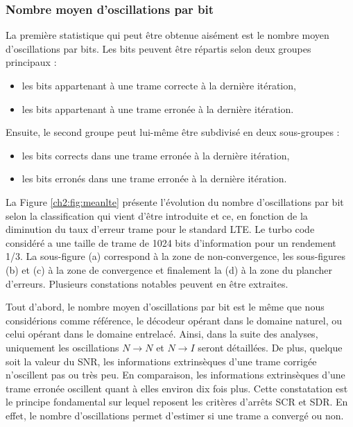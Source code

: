 \subsubsection{Nombre moyen d'oscillations par bit}
La première statistique qui peut être obtenue aisément est le nombre moyen d'oscillations par bits. Les bits peuvent être 
répartis selon deux groupes principaux :
\begin{itemize}
	\item les bits appartenant à une trame correcte à la dernière itération,
	\item les bits appartenant à une trame erronée à la dernière itération.\newline
\end{itemize}
Ensuite, le second groupe peut lui-même être subdivisé en deux sous-groupes :
\begin{itemize}
	\item les bits corrects dans une trame erronée à la dernière itération,
	\item les bits erronés dans une trame erronée à la dernière itération. \newline
\end{itemize}
La Figure \ref{ch2:fig:meanlte} présente l'évolution du nombre d'oscillations par bit selon la classification qui 
vient d'être introduite et ce, en fonction de la diminution du taux d'erreur trame pour le standard LTE. Le turbo code 
considéré a une taille de trame de 1024 bits d'information pour un rendement 1/3. La sous-figure 
(a) correspond à la zone de non-convergence, les sous-figures (b) et (c) à la zone de convergence et finalement la (d) à 
la zone du plancher d'erreurs. Plusieurs constations notables peuvent en être extraites. 

Tout d'abord, le nombre moyen d'oscillations par bit est le même que nous considérions comme référence, le décodeur opérant dans le 
domaine naturel, ou celui opérant dans le domaine entrelacé. Ainsi, dans la suite des analyses, uniquement les oscillations $N\rightarrow N$ 
et $N\rightarrow I$ seront détaillées.
De plus, quelque soit la valeur du SNR, les informations extrinsèques d'une trame corrigée n'oscillent pas ou très 
peu. En comparaison, les informations extrinsèques d'une trame erronée oscillent quant à elles environ dix fois plus.
Cette constatation est le principe fondamental sur lequel reposent les critères d'arrêts SCR et SDR. En effet, le nombre 
d'oscillations permet d'estimer si une trame a convergé ou non.

